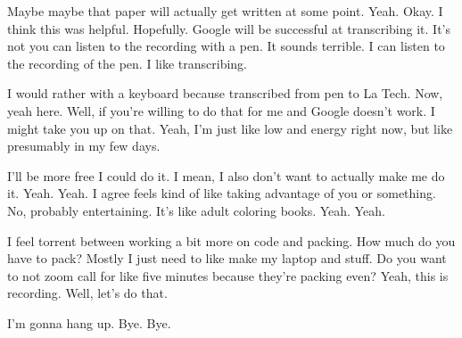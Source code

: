 Maybe maybe that paper will actually get written at some point. Yeah. Okay. I think this was helpful. Hopefully. Google will be successful at transcribing it. It's not you can listen to the recording with a pen. It sounds terrible. I can listen to the recording of the pen. I like transcribing. 

I would rather with a keyboard because transcribed from pen to La Tech. Now, yeah here. Well, if you're willing to do that for me and Google doesn't work. I might take you up on that. Yeah, I'm just like low and energy right now, but like presumably in my few days. 

I'll be more free I could do it. I mean, I also don't want to actually make me do it. Yeah. Yeah. I agree feels kind of like taking advantage of you or something. No, probably entertaining. It's like adult coloring books. Yeah. Yeah. 

I feel torrent between working a bit more on code and packing. How much do you have to pack? Mostly I just need to like make my laptop and stuff. Do you want to not zoom call for like five minutes because they're packing even? Yeah, this is recording. Well, let's do that. 

I'm gonna hang up. Bye. Bye.
